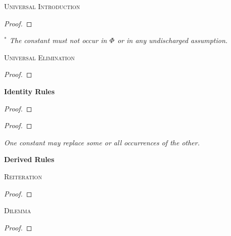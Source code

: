\textsc{Universal Introduction}


\begin{proof}
	 
\end{proof}

\begin{footnotesize}\emph{
$^\ast$ The constant  must not occur in $\varPhi{}$ or in any undischarged assumption.}
\end{footnotesize}



\textsc{Universal Elimination}

\begin{proof}
	 
\end{proof}




{\large \bf Identity Rules}

\begin{proof}
	 
\end{proof}

\begin{proof}
	 
	 
\end{proof}

\begin{footnotesize}\emph{One constant may replace some or all occurrences of the other.}
\end{footnotesize}





\newpage

{\large \bf Derived Rules}

\textsc{Reiteration}

\begin{proof}
	 
\end{proof}


\textsc{Dilemma}

\begin{proof}
	 
\end{proof}

